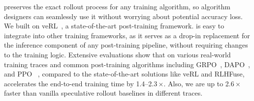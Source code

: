 {\sys} preserves the exact rollout process for any training algorithm,
so algorithm designers can seamlessly use it without worrying about potential accuracy loss.
We built {\sys} on {veRL}~\cite{hybridflow}, a state-of-the-art
post-training framework. 
{\sys} is easy to integrate into other training frameworks, as it serves as a drop-in replacement for the inference component 
of any post-training pipeline, without requiring changes to the training logic.
Extensive evaluations show that on various real-world training traces 
and common post-training algorithms including 
{GRPO~\cite{DBLP:journals/corr/abs-2402-03300,deepseek-r1}, DAPO~\cite{dapo}, and PPO~\cite{DBLP:journals/corr/SchulmanWDRK17}} , 
compared to the state-of-the-art solutions like {veRL and RLHFuse},
{\sys} accelerates the end-to-end training time by {1.4--2.3}\,$\times$.
Also, we are up to {2.6}\,$\times$
{faster than vanilla speculative rollout baselines in different traces.}
